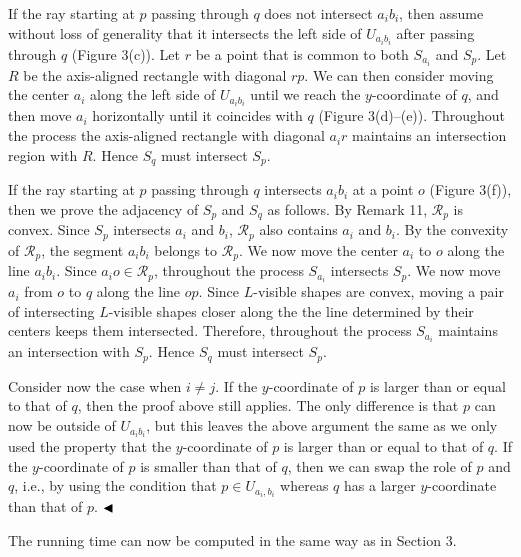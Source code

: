 \documentclass[10pt,a4paper]{amsart}
\begin{document}
\par
\par
If the ray starting at $p$ passing through $q$ does not intersect $a_{i}b_{i}$, then assume without loss of generality that it intersects the left side of $U_{a_{i}b_{i}}$ after passing through $q$ (Figure 3(c)). Let $r$ be a point that is common to both $S_{a_{i}}$ and $S_{p}$. Let $R$ be the axis-aligned rectangle with diagonal $rp$. We can then consider moving the center $a_{i}$ along the left side of $U_{a_{i}b_{i}}$ until we reach the $y$-coordinate of $q$, and then move $a_{i}$ horizontally until it coincides with $q$ (Figure 3(d)–(e)). Throughout the process the axis-aligned rectangle with diagonal $a_{i}r$ maintains an intersection region with $R$. Hence $S_{q}$ must intersect $S_{p}$.
\par
\par
If the ray starting at $p$ passing through $q$ intersects $a_{i}b_{i}$ at a point $o$ (Figure 3(f)), then we prove the adjacency of $S_{p}$ and $S_{q}$ as follows. By Remark 11, $\mathcal{R}_{p}$ is convex. Since $S_{p}$ intersects $a_{i}$ and $b_{i}$, $\mathcal{R}_{p}$ also contains $a_{i}$ and $b_{i}$. By the convexity of $\mathcal{R}_{p}$, the segment $a_{i}b_{i}$ belongs to $\mathcal{R}_{p}$. We now move the center $a_{i}$ to $o$ along the line $a_{i}b_{i}$. Since $a_{i}o\in\mathcal{R}_{p}$, throughout the process $S_{a_{i}}$ intersects $S_{p}$. We now move $a_{i}$ from $o$ to $q$ along the line $op$. Since $L$-visible shapes are convex, moving a pair of intersecting $L$-visible shapes closer along the the line determined by their centers keeps them intersected. Therefore, throughout the process $S_{a_{i}}$ maintains an intersection with $S_{p}$. Hence $S_{q}$ must intersect $S_{p}$.
\par
\par
Consider now the case when $i\not=j$. If the $y$-coordinate of $p$ is larger than or equal to that of $q$, then the proof above still applies. The only difference is that $p$ can now be outside of $U_{a_{i}b_{i}}$, but this leaves the above argument the same as we only used the property that the $y$-coordinate of $p$ is larger than or equal to that of $q$. If the $y$-coordinate of $p$ is smaller than that of $q$, then we can swap the role of $p$ and $q$, i.e., by using the condition that $p\in U_{a_{i},b_{i}}$ whereas $q$ has a larger $y$-coordinate than that of $p$. $\hfill\blacktriangleleft$
\par
\par
The running time can now be computed in the same way as in Section 3.
\par
\par
\end{document}
